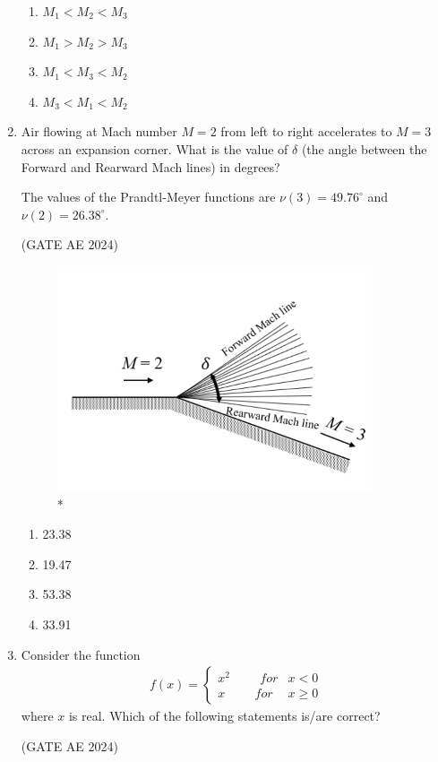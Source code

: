 \documentclass[journal,12pt,onecolumn]{IEEEtran}
\theoremstyle{remark}
\begin{document}
\begin{flushleft}
\begin{enumerate}
\begin{enumerate}
\item $M_1 < M_2 < M_3$  
\item $M_1 > M_2 > M_3$  
\item $M_1 < M_3 < M_2$  
\item $M_3 < M_1 < M_2$  
\end{enumerate}

\item Air flowing at Mach number $M = 2$ from left to right accelerates to $M = 3$ across an expansion corner. What is the value of $\delta$ (the angle between the Forward and Rearward Mach lines) in degrees? 

The values of the Prandtl-Meyer functions are $\nu(3) = 49.76^\circ$ and $\nu(2) = 26.38^\circ$. 

\hfill (GATE AE 2024)

\begin{figure}
\includegraphics[width=0.5\columnwidth]{figs/44.png}
\caption{*}
    \label{fig:placeholder}
\end{figure}

\begin{enumerate}
\item 23.38  
\item 19.47  
\item 53.38  
\item 33.91
\end{enumerate}  

\item Consider the function  
\begin{align*}
f(x) =
\begin{cases}
x^2 \hspace{1cm} for & x < 0 \\
x \hspace{1cm} for & x \ge 0
\end{cases}
\end{align*}
where $x$ is real. Which of the following statements is/are correct?  

\hfill (GATE AE 2024)


\end{enumerate}
\end{flushleft}
\end{document}
